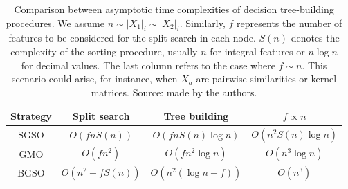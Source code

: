 

\begin{table}[h]
    \centering
    \begin{tabular}{c|c|c|c}
        \toprule
        Strategy
            & Split search
            & Tree building
            & $f \propto n$
        \\
        \midrule 
        SGSO
            & $O(f n S(n))$
            & $O(f n S(n) \log n)$
            & $O(n^2 S(n) \log n)$
        \\
        GMO
            & $O(f n^2)$
            & $O(f n^2 \log n)$
            & $O(n^3 \log n)$
        \\
        BGSO
            & $O(n^2 + f S(n))$
            & $O(n^2 (\log n + f))$
            & $O(n^3)$
        \\
        \bottomrule
    \end{tabular}
    \caption{
        Comparison between asymptotic time complexities of decision tree-building procedures.
        We assume $n \sim |X_1|_i \sim |X_2|_i$.
        Similarly, $f$ represents the number of features to be considered for the split search in each node.
        $S(n)$ denotes the complexity of the sorting procedure, usually $n$ for integral features or $n \log n$ for decimal values.
        The last column refers to the case where $f \sim n$. This scenario could arise, for instance, when $X_a$ are pairwise similarities or kernel matrices. 
        Source: made by the authors.
    }
    \label{tab:O_comparison}
\end{table}


